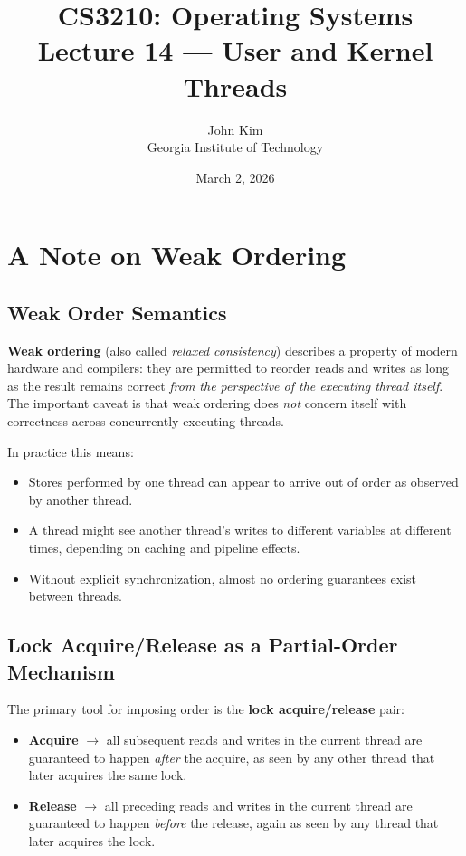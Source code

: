 \documentclass[11pt]{article}
\title{\textbf{CS3210: Operating Systems} \\ Lecture 14 --- User and Kernel Threads}
\author{John Kim \\ Georgia Institute of Technology}
\date{March 2, 2026}
\begin{document}
\maketitle
\tableofcontents
\newpage

\section{A Note on Weak Ordering}

\subsection{Weak Order Semantics}

\textbf{Weak ordering} (also called \emph{relaxed consistency}) describes a property of modern hardware and compilers: they are permitted to reorder reads and writes as long as the result remains correct \emph{from the perspective of the executing thread itself}. The important caveat is that weak ordering does \emph{not} concern itself with correctness across concurrently executing threads.

In practice this means:
\begin{itemize}
    \item Stores performed by one thread can appear to arrive out of order as observed by another thread.
    \item A thread might see another thread's writes to different variables at different times, depending on caching and pipeline effects.
    \item Without explicit synchronization, almost no ordering guarantees exist between threads.
\end{itemize}

\subsection{Lock Acquire/Release as a Partial-Order Mechanism}

The primary tool for imposing order is the \textbf{lock acquire/release} pair:
\begin{itemize}
    \item \textbf{Acquire} $\rightarrow$ all subsequent reads and writes in the current thread are guaranteed to happen \emph{after} the acquire, as seen by any other thread that later acquires the same lock.
    \item \textbf{Release} $\rightarrow$ all preceding reads and writes in the current thread are guaranteed to happen \emph{before} the release, again as seen by any thread that later acquires the lock.
\end{itemize}
\end{document}
